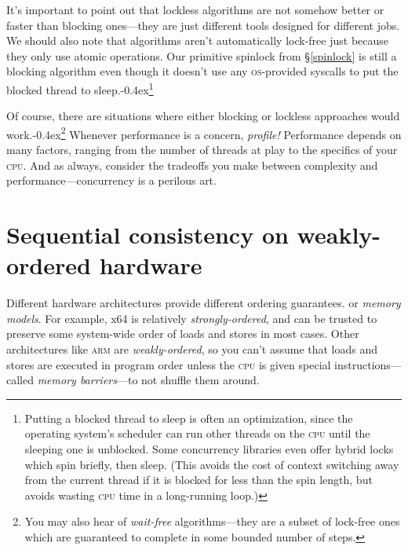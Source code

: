 \documentclass[fontsize=\bodyfontsize, numbers=endperiod]{scrartcl}
\newcommand{\punckern}{\kern-0.4ex}
\newcommand{\introduce}[1]{\textit{#1}}
\newcommand{\secref}[1]{\hyperref[#1]{\textsc{\S}\ref*{#1}}}
\begin{document}
\begin{multicols}{2}
It's important to point out that lockless algorithms are not somehow better
or faster than blocking ones---they are just different tools
designed for different jobs.
We should also note that algorithms aren't automatically lock-free just because
they only use atomic operations.
Our primitive spinlock from \secref{spinlock} is still a blocking
algorithm even though it doesn't use any \textsc{os}-provided syscalls to
put the blocked thread to sleep.\punckern\footnote{Putting a blocked thread
to sleep is often an optimization,
since the operating system's scheduler can run other threads on the \textsc{cpu}
until the sleeping one is unblocked.
Some concurrency libraries even offer hybrid locks which spin briefly,
then sleep.
(This avoids the cost of context switching away from the current thread if it
is blocked for less than the spin length, but avoids wasting \textsc{cpu}
time in a long-running loop.)}

Of course, there are situations where either blocking
or lockless approaches would work.\punckern\footnote{You
may also hear of \introduce{wait-free} algorithms---they are a subset of
lock-free ones which are guaranteed to complete in some
bounded number of steps.}
Whenever performance is a concern, \emph{profile!}
Performance depends on many factors,
ranging from the number of threads at
play to the specifics of your \textsc{cpu}.
And as always, consider the tradeoffs you make between
complexity and performance---concurrency is a perilous art.

\section{Sequential consistency on weakly-ordered hardware}

Different hardware architectures provide different ordering guarantees.
or \introduce{memory models}.
For example, x64 is relatively \introduce{strongly-ordered},
and can be trusted to preserve some system-wide order of
loads and stores in most cases.
Other architectures like \textsc{arm} are \introduce{weakly-ordered},
so you can't assume that loads and stores are executed in
program order unless the \textsc{cpu} is given special instructions---called
\introduce{memory barriers}---to not shuffle them around.


\end{multicols}
\end{document}
